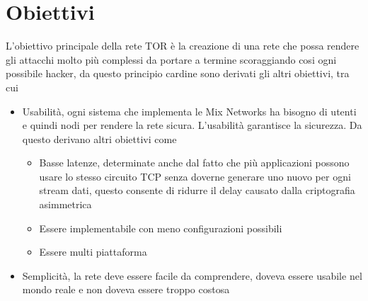 \newpage
\section{Obiettivi}
L'obiettivo principale della rete TOR è la creazione di una rete che possa rendere gli attacchi molto più complessi da portare a termine scoraggiando cosi ogni possibile hacker, da questo principio cardine sono derivati gli altri obiettivi, tra cui
\begin{itemize}
    \item Usabilità, ogni sistema che implementa le Mix Networks ha bisogno di utenti e quindi nodi per rendere la rete sicura. L'usabilità garantisce la sicurezza. Da questo derivano altri obiettivi come
    \begin{itemize}
        \item Basse latenze, determinate anche dal fatto che più applicazioni possono usare lo stesso circuito TCP senza doverne generare uno nuovo per ogni stream dati, questo consente di ridurre il delay causato dalla criptografia asimmetrica
        \item Essere implementabile con meno configurazioni possibili
        \item Essere multi piattaforma
    \end{itemize}
    \item Semplicità, la rete deve essere facile da comprendere, doveva essere usabile nel mondo reale e non doveva essere troppo costosa
\end{itemize}

\cite{ChaumMixes}
